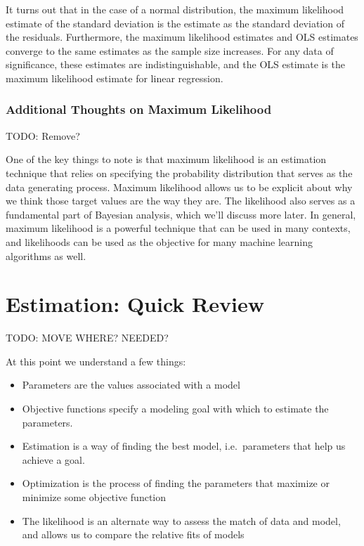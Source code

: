 \documentclass[
  letterpaper,
]{krantz}
\providecommand{\tightlist}{%
  \setlength{\itemsep}{0pt}\setlength{\parskip}{0pt}}\usepackage{longtable,booktabs,array}
\begin{document}
It turns out that in the case of a normal distribution, the maximum
likelihood estimate of the standard deviation is the estimate as the
standard deviation of the residuals. Furthermore, the maximum likelihood
estimates and OLS estimates converge to the same estimates as the sample
size increases. For any data of significance, these estimates are
indistinguishable, and the OLS estimate is the maximum likelihood
estimate for linear regression.

\subsubsection{Additional Thoughts on Maximum
Likelihood}\label{sec-estim-maxlike-add}

TODO: Remove?

One of the key things to note is that maximum likelihood is an
estimation technique that relies on specifying the probability
distribution that serves as the data generating process. Maximum
likelihood allows us to be explicit about why we think those target
values are the way they are. The likelihood also serves as a fundamental
part of Bayesian analysis, which we'll discuss more later. In general,
maximum likelihood is a powerful technique that can be used in many
contexts, and likelihoods can be used as the objective for many machine
learning algorithms as well.

\section{Estimation: Quick Review}\label{sec-estim-review}

TODO: MOVE WHERE? NEEDED?

At this point we understand a few things:

\begin{itemize}
\tightlist
\item
  Parameters are the values associated with a model
\item
  Objective functions specify a modeling goal with which to estimate the
  parameters.
\item
  Estimation is a way of finding the best model, i.e.~parameters that
  help us achieve a goal.
\item
  Optimization is the process of finding the parameters that maximize or
  minimize some objective function
\item
  The likelihood is an alternate way to assess the match of data and
  model, and allows us to compare the relative fits of models
\end{itemize}
\end{document}
